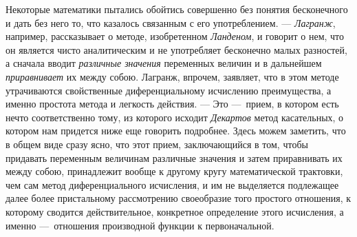 {Некоторые математики пытались обойтись совершенно без понятия бесконечного и
дать без него то, что казалось связанным с его употреблением. —
{\em Лагранж}, например, рассказывает о методе,
изобретенном {\em Ланденом}, и говорит о нем, что он
является чисто аналитическим и не употребляет бесконечно малых разностей, а
сначала вводит {\em различные значения} переменных
величин и в дальнейшем {\em приравнивает} их между
собою. Лагранж, впрочем, заявляет, что в этом методе утрачиваются
свойственные диференциальному исчислению преимущества, а именно простота
метода и легкость действия. — Это —~прием, в котором есть нечто
соответственно тому, из которого исходит {\em Декартов}
метод касательных, о котором нам придется ниже еще говорить подробнее.
Здесь можем заметить, что в общем виде сразу ясно, что этот прием,
заключающийся в том, чтобы придавать переменным величинам различные
значения и затем приравнивать их между собою, принадлежит вообще к другому
кругу математической трактовки, чем сам метод диференциального исчисления,
и им не выделяется подлежащее далее более пристальному рассмотрению
своеобразие того простого отношения, к которому сводится действительное,
конкретное определение этого исчисления, а именно —~отношения производной
функции к первоначальной.

}
